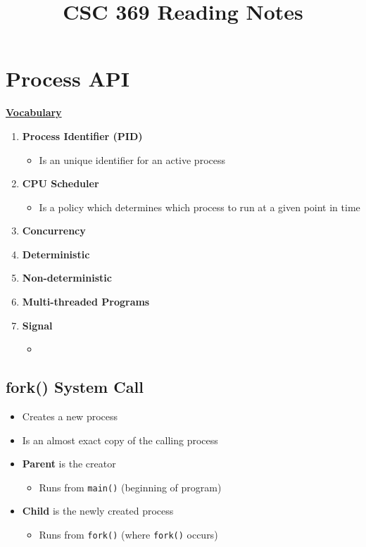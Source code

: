 \documentclass[12pt]{article}
\begin{document}
\title{CSC 369 Reading Notes}

\section{Process API}

\begin{mdframed}
\underline{\textbf{Vocabulary}}

\bigskip

\begin{enumerate}[1.]
    \item \textbf{Process Identifier (PID)}
    \begin{itemize}
        \item Is an unique identifier for an active process
    \end{itemize}
    \item \textbf{CPU Scheduler}
    \begin{itemize}
        \item Is a policy which determines which process to run at a given point in time
    \end{itemize}
    \item \textbf{Concurrency}
    \item \textbf{Deterministic}
    \item \textbf{Non-deterministic}
    \item \textbf{Multi-threaded Programs}
    \item \textbf{Signal}
    \begin{itemize}
        \item
    \end{itemize}
\end{enumerate}

\end{mdframed}

\subsection{fork() System Call}
\begin{itemize}
    \item Creates a new process
    \item Is an almost exact copy of the calling process
    \item \textbf{Parent} is the creator
    \begin{itemize}
        \item Runs from \texttt{main()} (beginning of program)
    \end{itemize}
    \item \textbf{Child} is the newly created process
    \begin{itemize}
        \item Runs from \texttt{fork()} (where \texttt{fork()} occurs)
    \end{itemize}
\end{itemize}
\end{document}
